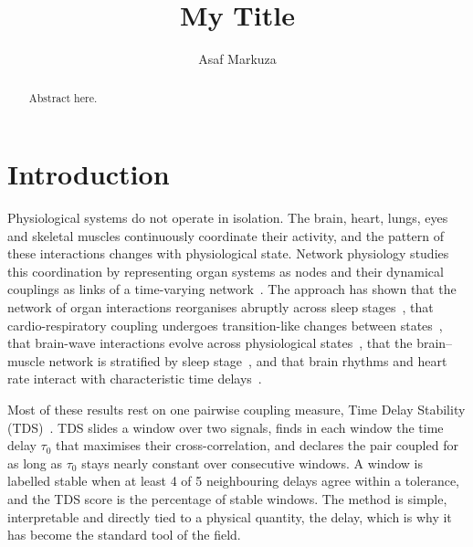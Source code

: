 \documentclass[11pt,a4paper]{article}
\title{My Title}
\author{Asaf Markuza}
\date{}
\begin{document}
\maketitle

\begin{abstract}
Abstract here.
\end{abstract}

\section{Introduction}
\label{sec:intro}
Physiological systems do not operate in isolation. The brain, heart, lungs, eyes and skeletal muscles continuously coordinate their activity, and the pattern of these interactions changes with physiological state. Network physiology studies this coordination by representing organ systems as nodes and their dynamical couplings as links of a time-varying network~\cite{Bashan2012NetworkPhysiology,Bartsch2015NetworkPhysiology,Ivanov2016FocusEmerging,Ivanov2021NewField}. The approach has shown that the network of organ interactions reorganises abruptly across sleep stages~\cite{Bashan2012NetworkPhysiology,Bartsch2015NetworkPhysiology}, that cardio-respiratory coupling undergoes transition-like changes between states~\cite{Bartsch2012PhaseTransitions}, that brain-wave interactions evolve across physiological states~\cite{Liu2015PlasticityBrain,Liu2015MajorComponent}, that the brain--muscle network is stratified by sleep stage~\cite{Rizzo2020NetworkPhysiology,Rizzo2022DynamicNetworks}, and that brain rhythms and heart rate interact with characteristic time delays~\cite{Lin2016DelaycorrelationLandscape}.

Most of these results rest on one pairwise coupling measure, Time Delay Stability (TDS)~\cite{Bashan2012NetworkPhysiology,Bartsch2015NetworkPhysiology}. TDS slides a window over two signals, finds in each window the time delay $\tau_0$ that maximises their cross-correlation, and declares the pair coupled for as long as $\tau_0$ stays nearly constant over consecutive windows. A window is labelled stable when at least 4 of 5 neighbouring delays agree within a tolerance, and the TDS score is the percentage of stable windows. The method is simple, interpretable and directly tied to a physical quantity, the delay, which is why it has become the standard tool of the field.
\end{document}
